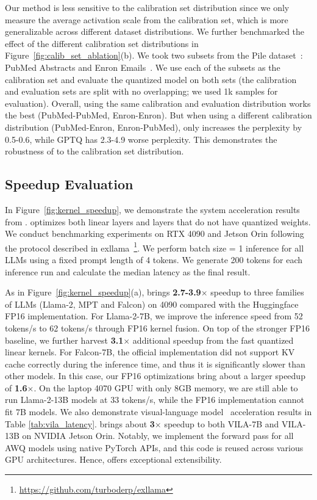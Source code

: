 Our method is less sensitive to the calibration set distribution since we only measure the average activation scale from the calibration set, which is more generalizable across different dataset distributions. We further benchmarked the effect of the different calibration set distributions in Figure~\ref{fig:calib_set_ablation}(b). We took two subsets from the Pile dataset~\cite{gao2020pile}: PubMed Abstracts and Enron Emails~\cite{klimt2004enron}. We use each of the subsets as the calibration set and evaluate the quantized model on both sets (the calibration and evaluation sets are split with no overlapping; we used 1k samples for evaluation). Overall, using the same calibration and evaluation distribution works the best (PubMed-PubMed, Enron-Enron). But when using a different calibration distribution (PubMed-Enron, Enron-PubMed), \methodshort only increases the perplexity by 0.5-0.6, while GPTQ has 2.3-4.9 worse perplexity. This demonstrates the robustness of \methodshort to the calibration set distribution. 

\subsection{Speedup Evaluation}



 In Figure~\ref{fig:kernel_speedup}, we demonstrate the system acceleration results from \system. \system optimizes both linear layers and layers that do not have quantized weights. We conduct benchmarking experiments on RTX 4090 and Jetson Orin following the protocol described in exllama~\footnote{\url{https://github.com/turboderp/exllama}}. We perform batch size = 1 inference for all LLMs using a fixed prompt length of 4 tokens. We generate 200 tokens for each inference run and calculate the median latency as the final result.

 As in Figure~\ref{fig:kernel_speedup}(a), \system brings \textbf{2.7-3.9$\times$} speedup to three families of LLMs (Llama-2, MPT and Falcon) on 4090 compared with the Huggingface FP16 implementation. For Llama-2-7B, we improve the inference speed from 52 tokens/s to 62 tokens/s through FP16 kernel fusion. On top of the stronger FP16 baseline, we further harvest \textbf{3.1$\times$} additional speedup from the fast quantized linear kernels. For Falcon-7B, the official implementation did not support KV cache correctly during the inference time, and thus it is significantly slower than other models. In this case, our FP16 optimizations bring about a larger speedup of \textbf{1.6$\times$}. On the laptop 4070 GPU with only 8GB memory, we are still able to run Llama-2-13B models at 33 tokens/s, while the FP16 implementation cannot fit 7B models. We also demonstrate visual-language model~\cite{lin2023vila} acceleration results in Table \ref{tab:vila_latency}. \system brings about \textbf{3$\times$} speedup to both VILA-7B and VILA-13B on NVIDIA Jetson Orin. Notably, we implement the forward pass for all AWQ models using native PyTorch APIs, and this code is reused across various GPU architectures. Hence, \system offers exceptional extensibility. %


